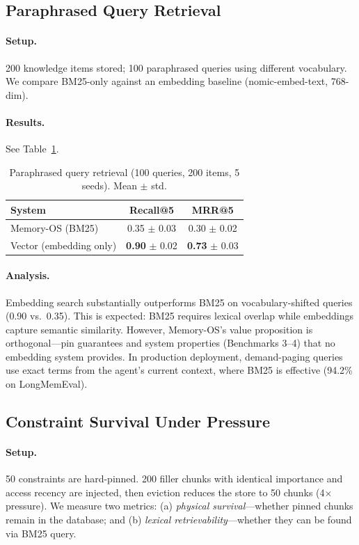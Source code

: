 \documentclass[10pt,twocolumn]{article}
\begin{document}
\subsection{Paraphrased Query Retrieval}

\paragraph{Setup.} 200 knowledge items stored; 100 paraphrased queries using different vocabulary. We compare BM25-only against an embedding baseline (nomic-embed-text, 768-dim).

\paragraph{Results.} See Table~\ref{tab:retention}.

\begin{table}[t]
\centering
\caption{Paraphrased query retrieval (100 queries, 200 items, 5 seeds). Mean $\pm$ std.}
\label{tab:retention}
\small
\begin{tabular}{lcc}
\toprule
System & Recall@5 & MRR@5 \\
\midrule
Memory-OS (BM25)           & 0.35 $\pm$ 0.03 & 0.30 $\pm$ 0.02 \\
Vector (embedding only)    & \textbf{0.90} $\pm$ 0.02 & \textbf{0.73} $\pm$ 0.03 \\
\bottomrule
\end{tabular}
\end{table}

\paragraph{Analysis.} Embedding search substantially outperforms BM25 on vocabulary-shifted queries (0.90 vs.\ 0.35). This is expected: BM25 requires lexical overlap while embeddings capture semantic similarity. However, Memory-OS's value proposition is orthogonal---pin guarantees and system properties (Benchmarks 3--4) that no embedding system provides. In production deployment, demand-paging queries use exact terms from the agent's current context, where BM25 is effective (94.2\% on LongMemEval).

\subsection{Constraint Survival Under Pressure}

\paragraph{Setup.} 50 constraints are hard-pinned. 200 filler chunks with identical importance and access recency are injected, then eviction reduces the store to 50 chunks (4$\times$ pressure). We measure two metrics: (a) \emph{physical survival}---whether pinned chunks remain in the database; and (b) \emph{lexical retrievability}---whether they can be found via BM25 query.
\end{document}

